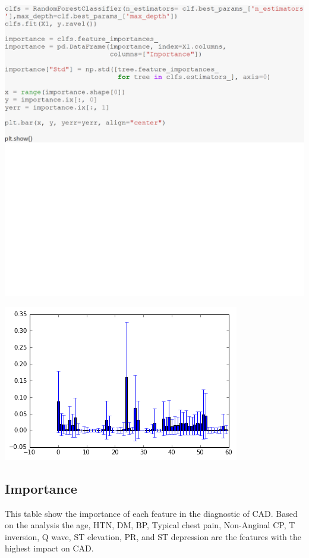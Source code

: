 \documentclass[sigconf]{acmart}
\begin{document}
\includegraphics[width=0.95\columnwidth]{project/images/Untitled6.png}

\includegraphics[width=0.95\columnwidth]{images/output_17_0.png}


\subsection{Importance}

This table show the importance of each feature in the diagnostic of CAD. Based on the analysis the age, HTN,  DM, BP, Typical chest pain, Non-Anginal  CP, T  inversion, Q  wave,  ST elevation, PR, and ST depression are the features with the highest impact on CAD.
\end{document}
